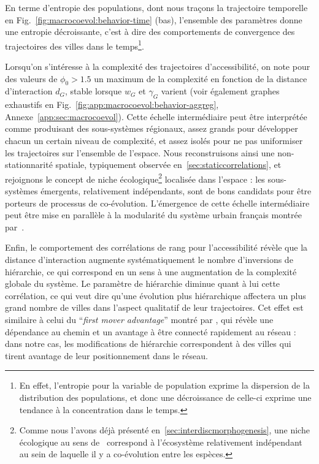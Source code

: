 En terme d'entropie des populations, dont nous traçons la trajectoire temporelle en Fig.~\ref{fig:macrocoevol:behavior-time} (bas), l'ensemble des paramètres donne une entropie décroissante, c'est à dire des comportements de convergence des trajectoires des villes dans le temps\footnote{En effet, l'entropie pour la variable de population exprime la dispersion de la distribution des populations, et donc une décroissance de celle-ci exprime une tendance à la concentration dans le temps.}.



Lorsqu'on s'intéresse à la complexité des trajectoires d'accessibilité, on note pour des valeurs de $\phi_0 > 1.5$ un maximum de la complexité en fonction de la distance d'interaction $d_G$, stable lorsque $w_G$ et $\gamma_G$ varient (voir également graphes exhaustifs en Fig.~\ref{fig:app:macrocoevol:behavior-aggreg}, Annexe~\ref{app:sec:macrocoevol}). Cette échelle intermédiaire peut être interprétée comme produisant des sous-systèmes régionaux, assez grands pour développer chacun un certain niveau de complexité, et assez isolés pour ne pas uniformiser les trajectoires sur l'ensemble de l'espace. Nous reconstruisons ainsi une non-stationnarité spatiale, typiquement observée en~\ref{sec:staticcorrelations}, et rejoignons le concept de niche écologique\footnote{Comme nous l'avons déjà présenté en~\ref{sec:interdiscmorphogenesis}, une niche écologique au sens de~\cite{holland2012signals} correspond à l'écosystème relativement indépendant au sein de laquelle il y a co-évolution entre les espèces.} localisée dans l'espace : les sous-systèmes émergents, relativement indépendants, sont de bons candidats pour être porteurs de processus de co-évolution. L'émergence de cette échelle intermédiaire peut être mise en parallèle à la modularité du système urbain français montrée par~\cite{berroir2017systemes}.



Enfin, le comportement des corrélations de rang pour l'accessibilité révèle que la distance d'interaction augmente systématiquement le nombre d'inversions de hiérarchie, ce qui correspond en un sens à une augmentation de la complexité globale du système. Le paramètre de hiérarchie diminue quant à lui cette corrélation, ce qui veut dire qu'une évolution plus hiérarchique affectera un plus grand nombre de villes dans l'aspect qualitatif de leur trajectoires. Cet effet est similaire à celui du ``\textit{first mover advantage}'' montré par \cite{levinson2011does}, qui révèle une dépendance au chemin et un avantage à être connecté rapidement au réseau : dans notre cas, les modifications de hiérarchie correspondent à des villes qui tirent avantage de leur positionnement dans le réseau.





